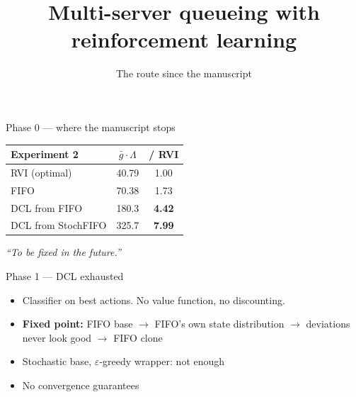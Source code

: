 \documentclass[12pt,aspectratio=169]{beamer}
\title[Queueing with RL]{Multi-server queueing with reinforcement learning}
\subtitle{The route since the manuscript}
\author{}
\date{}
\newcommand{\good}[1]{\textbf{#1}}
\begin{document}
\begin{frame}
\titlepage
\end{frame}

\begin{frame}{Phase 0 --- where the manuscript stops}

\begin{center}
\large
\begin{tabular}{lcc}
\toprule
Experiment 2 & $\bar g \cdot \Lambda$ & / RVI \\
\midrule
RVI (optimal)      & 40.79  & 1.00 \\
FIFO               & 70.38  & 1.73 \\
\midrule
DCL from FIFO      & 180.3  & \good{4.42} \\
DCL from StochFIFO & 325.7  & \good{7.99} \\
\bottomrule
\end{tabular}
\end{center}

\vfill
\begin{block}{}
\centering \emph{``To be fixed in the future.''}
\end{block}

\end{frame}

\begin{frame}{Phase 1 --- DCL exhausted}

\begin{itemize}
  \item Classifier on best actions.  No value function, no discounting.
  \vfill
  \item \good{Fixed point:} FIFO base $\to$ FIFO's own state distribution $\to$
        deviations never look good $\to$ FIFO clone
  \vfill
  \item Stochastic base, $\varepsilon$-greedy wrapper: not enough
  \vfill
  \item No convergence guarantees
\end{itemize}

\end{frame}
\end{document}
